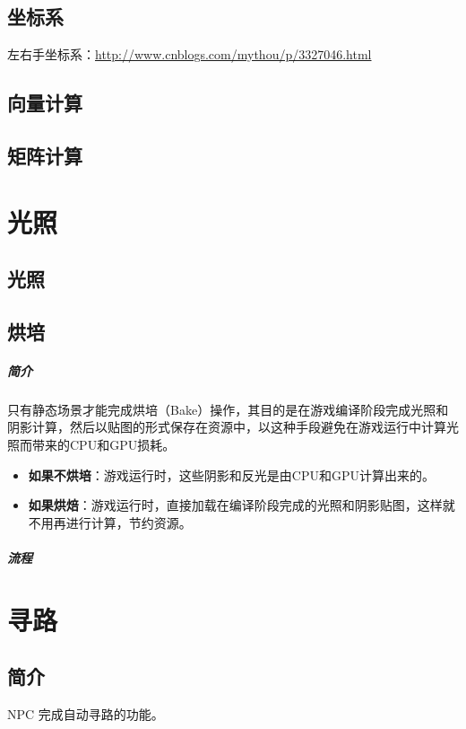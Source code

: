 \documentclass[UTF8,a4paper,12pt]{ctexbook}
\begin{document}
	\section{坐标系}
		左右手坐标系：\url{http://www.cnblogs.com/mythou/p/3327046.html}
	
	\section{向量计算}
	
	
	\section{矩阵计算}
	
	
	
\chapter{光照}
	\section{光照}
		
	\section{烘培}
		\paragraph{简介}
			只有静态场景才能完成烘培（Bake）操作，其目的是在游戏编译阶段完成光照和阴影计算，然后以贴图的形式保存在资源中，以这种手段避免在游戏运行中计算光照而带来的CPU和GPU损耗。
			
			\begin{itemize}
				\item \textbf{如果不烘培}：游戏运行时，这些阴影和反光是由CPU和GPU计算出来的。
				\item \textbf{如果烘焙}：游戏运行时，直接加载在编译阶段完成的光照和阴影贴图，这样就不用再进行计算，节约资源。
			\end{itemize}
		
		\paragraph{流程}
	
	
\chapter{寻路}
	\section{简介}
		NPC 完成自动寻路的功能。
		
\end{document}

